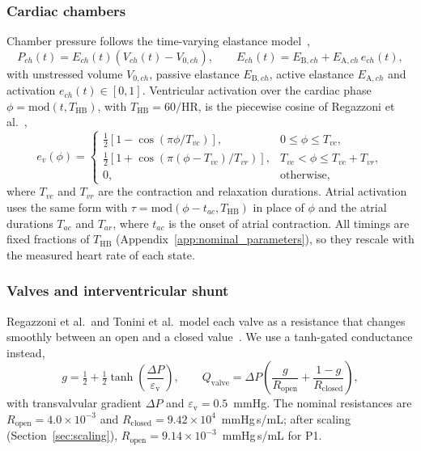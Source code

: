 \FloatBarrier
\subsubsection{Cardiac chambers}
Chamber pressure follows the time-varying elastance model~\cite{Suga1974,Regazzoni2022},
\begin{equation}
P_{ch}(t) = E_{ch}(t)\left(V_{ch}(t) - V_{0,ch}\right), \qquad
E_{ch}(t) = E_{\mathrm{B},ch} + E_{\mathrm{A},ch}\, e_{ch}(t),
\label{eq:elastance}
\end{equation}
with unstressed volume $V_{0,ch}$, passive elastance $E_{\mathrm{B},ch}$, active elastance $E_{\mathrm{A},ch}$ and activation $e_{ch}(t)\in[0,1]$. Ventricular activation over the cardiac phase $\phi = \mathrm{mod}(t, T_{\mathrm{HB}})$, with $T_{\mathrm{HB}} = 60/\mathrm{HR}$, is the piecewise cosine of Regazzoni et al.~\cite{Regazzoni2022},
\begin{equation}
e_v(\phi) =
\begin{cases}
\tfrac{1}{2}\left[1-\cos\left(\pi\phi/T_{vc}\right)\right], & 0 \le \phi \le T_{vc},\\[3pt]
\tfrac{1}{2}\left[1+\cos\left(\pi(\phi-T_{vc})/T_{vr}\right)\right], & T_{vc} < \phi \le T_{vc}+T_{vr},\\[3pt]
0, & \text{otherwise},
\end{cases}
\label{eq:activation}
\end{equation}
where $T_{vc}$ and $T_{vr}$ are the contraction and relaxation durations. Atrial activation uses the same form with $\tau = \mathrm{mod}(\phi - t_{ac}, T_{\mathrm{HB}})$ in place of $\phi$ and the atrial durations $T_{ac}$ and $T_{ar}$, where $t_{ac}$ is the onset of atrial contraction. All timings are fixed fractions of $T_{\mathrm{HB}}$ (Appendix~\ref{app:nominal_parameters}), so they rescale with the measured heart rate of each state.

\FloatBarrier
\subsubsection{Valves and interventricular shunt}
\label{sec:valves}
Regazzoni et al.\ and Tonini et al.\ model each valve as a resistance that changes smoothly between an open and a closed value~\cite{Regazzoni2022,Tonini2025}. We use a tanh-gated conductance instead,
\begin{equation}
g = \tfrac{1}{2} + \tfrac{1}{2}\tanh\!\left(\frac{\Delta P}{\varepsilon_{\mathrm{v}}}\right), \qquad
Q_{\mathrm{valve}} = \Delta P\left(\frac{g}{R_{\mathrm{open}}} + \frac{1-g}{R_{\mathrm{closed}}}\right),
\label{eq:valve}
\end{equation}
with transvalvular gradient $\Delta P$ and $\varepsilon_{\mathrm{v}} = 0.5$~mmHg. The nominal resistances are $R_{\mathrm{open}} = 4.0\times10^{-3}$ and $R_{\mathrm{closed}} = 9.42\times10^{4}$~mmHg\,s/mL; after scaling (Section~\ref{sec:scaling}), $R_{\mathrm{open}} = 9.14\times10^{-3}$~mmHg\,s/mL for P1.

